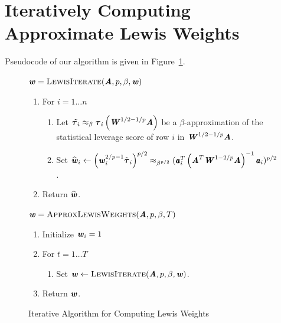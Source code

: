 \section{Iteratively Computing Approximate Lewis Weights}
\label{sec:compute}

Pseudocode of our algorithm is given in Figure~\ref{fig:iteration}.

\begin{figure}[ht]

\begin{algbox}

$\boldsymbol{\mathit{w}} = \textsc{LewisIterate}(\boldsymbol{\mathit{A}}, p, \beta, \boldsymbol{\mathit{w}})$

\begin{enumerate}
	\item For $i = 1 \ldots n$
	\begin{enumerate}
		\item Let $\tilde{\boldsymbol{\tau}_i} \approx_{\beta} \boldsymbol{\tau}_{i} \left( \boldsymbol{\mathit{W}}^{1/2 - 1/p} \boldsymbol{\mathit{A}} \right)$ be a $\beta$-approximation of the statistical leverage score of row $i$ in $\boldsymbol{\mathit{W}}^{1/2 - 1/p} \boldsymbol{\mathit{A}}$.
		\item Set $\boldsymbol{\widehat{\mathit{w}}}_i \leftarrow \left( \boldsymbol{\mathit{w}}_i^{2/p - 1} \tilde{\boldsymbol{\tau}}_i \right)^{p/2} \approx_{\beta^{p/2}} (\pmb{\mathit{a}}_i^T \left( \boldsymbol{\mathit{A}}^T \boldsymbol{\mathit{W}}^{1 - 2/p} \boldsymbol{\mathit{A}} \right)^{-1} \pmb{\mathit{a}}_i)^{p/2}$.
	\end{enumerate}
	\item Return $\boldsymbol{\widehat{\mathit{w}}}$.
\end{enumerate}

$\boldsymbol{\mathit{w}} =\textsc{ApproxLewisWeights}(\boldsymbol{\mathit{A}}, p, \beta, T)$

\begin{enumerate}
	\item Initialize $\boldsymbol{\mathit{w}}_i  = 1$
	\item For $t = 1 \ldots T$
	\begin{enumerate}
		\item Set $\boldsymbol{\mathit{w}} \leftarrow \textsc{LewisIterate}(\boldsymbol{\mathit{A}}, p, \beta, \boldsymbol{\mathit{w}})$.
	\end{enumerate}
	\item Return $\boldsymbol{\mathit{w}}$.
\end{enumerate}
\end{algbox}

\caption{Iterative Algorithm for Computing Lewis Weights}
\label{fig:iteration}

\end{figure}

